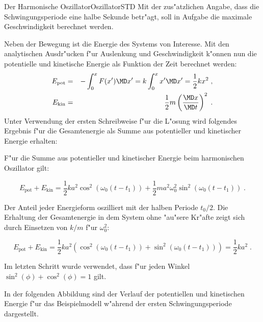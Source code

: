 \begin{MXContent}{Der Harmonische Oszillator}{Oszillator}{STD}
Mit der zus"atzlichen Angabe, dass die Schwingungsperiode eine halbe Sekunde betr"agt, soll in Aufgabe
die maximale Geschwindigkeit berechnet werden.


Neben der Bewegung ist die Energie des Systems von Interesse. Mit den analytischen Ausdr"ucken f"ur Auslenkung und Geschwindigkeit k"onnen nun die potentielle und kinetische Energie als Funktion der Zeit berechnet werden:
\begin{eqnarray}
  E_\mathrm{pot} &=& -\int_0^x F(x') \MD x' = k \int_0^x x' \MD x' = \frac{1}{2} k x^2\; ,\\
  E_\mathrm{kin} &=& \frac{1}{2} m \left(\frac{\MD x}{\MD t}\right)^2\; .
\end{eqnarray}
Unter Verwendung der ersten Schreibweise f"ur die L"osung wird folgendes Ergebnis f"ur die Gesamtenergie als Summe aus potentieller und kinetischer Energie erhalten:

\begin{MInfo}
F"ur die Summe aus potentieller und kinetischer Energie beim harmonischen Oszillator gilt:

\begin{equation}
  E_{\text{pot}} + E_{\text{kin}} = \frac{1}{2} k a^2 \cos^2\left( \omega_0(t-t_1)\right)+\frac{1}{2} m a^2 \omega_0^2 \sin^2\left(\omega_0(t-t_1)\right)\;.
\end{equation}

Der Anteil jeder Energieform oszilliert mit der halben Periode $t_0/2$. Die Erhaltung der Gesamtenergie in dem System ohne "au"sere Kr"afte zeigt sich durch Einsetzen von $k/m$ f"ur $\omega_0^2$:

\begin{equation}
  E_{\text{pot}} + E_{\text{kin}} = \frac{1}{2} k a^2 \left(\cos^2\left( \omega_0(t-t_1)\right)+ \sin^2\left(\omega_0(t-t_1)\right)\right) = \frac{1}{2} k a^2 \;.
\end{equation}

Im letzten Schritt wurde verwendet, dass f"ur jeden Winkel $\sin^2(\phi) + \cos^2(\phi) = 1$ gilt.

\end{MInfo}

\begin{MExample}
In der folgenden Abbildung sind der Verlauf der potentiellen und kinetischen Energie f"ur das Beispielmodell w"ahrend der ersten Schwingungsperiode dargestellt.

\begin{center}
  \end{center}


\end{MExample}
\end{MXContent}
